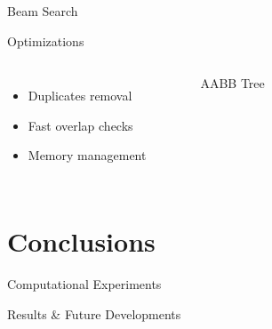 \documentclass{beamer}
\begin{document}
    \begin{frame}{Beam Search}
    \end{frame}
    \begin{frame}{Optimizations}
        \begin{columns}[onlytextwidth,T]
        \column{\dimexpr\linewidth-65mm-5mm}
            \begin{itemize}
                \item Duplicates removal
                \item Fast overlap checks
                \item Memory management
            \end{itemize}
        \column{65mm}
            \begin{figure}[h]
                \resizebox*{\columnwidth}{!}{%
                
                }
                \caption{AABB Tree}
            \end{figure}
        \end{columns}
    \end{frame}

    \section{Conclusions}

    \begin{frame}{Computational Experiments}
    \end{frame}

    \begin{frame}{Results \& Future Developments}
    \end{frame}
\end{document}
